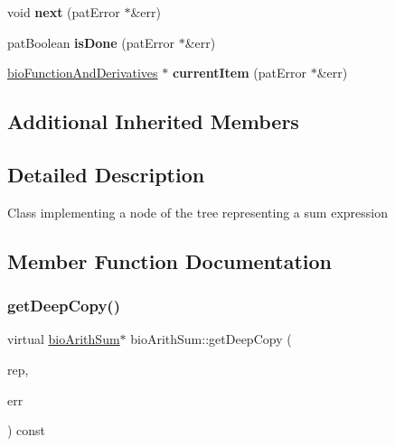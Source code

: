 \begin{DoxyCompactItemize}
\item 
\mbox{\label{classbio_arith_sum_a8f37c0eccb1fdc7f6aea57053332e438}} 
void {\bfseries next} (pat\+Error $\ast$\&err)
\item 
\mbox{\label{classbio_arith_sum_a22b293eefd5b26bdc102d2dbe938e5fd}} 
pat\+Boolean {\bfseries is\+Done} (pat\+Error $\ast$\&err)
\item 
\mbox{\label{classbio_arith_sum_ab572e72d4fe22ab773ba8e61d5c18c69}} 
\hyperlink{classbio_function_and_derivatives}{bio\+Function\+And\+Derivatives} $\ast$ {\bfseries current\+Item} (pat\+Error $\ast$\&err)
\end{DoxyCompactItemize}
\subsection*{Additional Inherited Members}


\subsection{Detailed Description}
Class implementing a node of the tree representing a sum expression 

\subsection{Member Function Documentation}
\mbox{\label{classbio_arith_sum_ab3264f5810c52c59b96ae72370e441ff}} 
\subsubsection{\texorpdfstring{get\+Deep\+Copy()}{getDeepCopy()}\hspace{0.1cm}{\footnotesize\ttfamily [1/4]}}
{\footnotesize\ttfamily virtual \hyperlink{classbio_arith_sum}{bio\+Arith\+Sum}$\ast$ bio\+Arith\+Sum\+::get\+Deep\+Copy (\begin{DoxyParamCaption}\item[{\hyperlink{classbio_expression_repository}{bio\+Expression\+Repository} $\ast$}]{rep,  }\item[{pat\+Error $\ast$\&}]{err }\end{DoxyParamCaption}) const\hspace{0.3cm}{\ttfamily [virtual]}}

